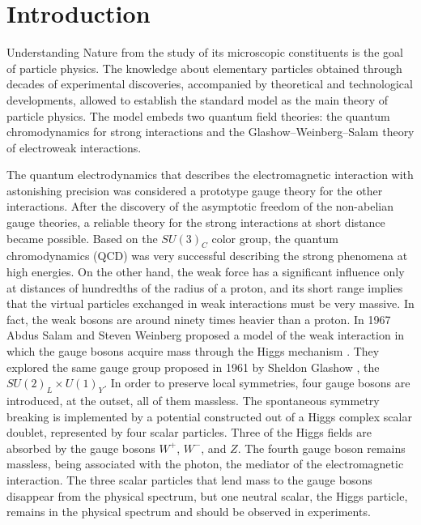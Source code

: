 \chapter{Introduction}

Understanding Nature from the study of its microscopic constituents is the goal of particle physics. The knowledge about elementary particles obtained through decades of experimental discoveries, accompanied by theoretical and technological developments, allowed to establish the standard model \cite{Novaes:1999yn} as the main theory of particle physics. The model embeds two quantum field theories: the quantum chromodynamics \cite{Muta:1998vi} for strong interactions and the Glashow--Weinberg--Salam theory \cite{Bilenky:1982ms} of electroweak interactions.

The quantum electrodynamics \cite{qcdFeynman} that describes the electromagnetic interaction with astonishing precision was considered a prototype gauge theory for the other interactions. After the discovery of the asymptotic freedom of the non-abelian gauge theories, a reliable theory for the strong interactions at short distance became possible. Based on the $SU(3)_C$ color group, the quantum chromodynamics (QCD) was very successful describing the strong phenomena at high energies. On the other hand, the weak force has a significant influence only at distances of hundredths of the radius of a proton, and its short range implies that the virtual particles exchanged in weak interactions must be very massive. In fact, the weak bosons are around ninety times heavier than a proton. In 1967 Abdus Salam and Steven Weinberg proposed a model of the weak interaction in which the gauge bosons acquire mass through the Higgs mechanism \cite{Higgs:1966ev, Englert:1964et}. They explored the same gauge group proposed in 1961 by Sheldon Glashow \cite{Glashow:1961tr}, the $SU(2)_L\times U(1)_Y$. In order to preserve local symmetries, four gauge bosons are introduced, at the outset, all of them massless. The spontaneous symmetry breaking is implemented by a potential constructed out of a Higgs complex scalar doublet, represented by four scalar particles. Three of the Higgs fields are absorbed by the gauge bosons $W^+$, $W^-$, and $Z$. The fourth gauge boson remains massless, being associated with the photon, the mediator of the electromagnetic interaction. The three scalar particles that lend mass to the gauge bosons disappear from the physical spectrum, but one neutral scalar, the Higgs particle, remains in the physical spectrum and should be observed in experiments.  
 

